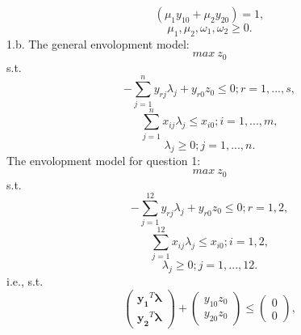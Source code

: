 \documentclass{article}
\begin{document}
$$ (\mu_1 y_{10} + \mu_2 y_{20}) = 1, $$
$$ \mu_1, \mu_2, \omega_1, \omega_2 \geq 0. $$
1.b.
The general envolopment model:
$$ max\ z_0 $$
s.t.
$$ - \sum_{j = 1}^n y_{rj} \lambda_j + y_{r0} z_0 \leq 0; r = 1, ..., s, $$
$$ \sum_{j=1}^n x_{ij} \lambda_j \leq x_{i0}; i = 1, ..., m, $$
$$ \lambda_j \geq 0; j = 1, ..., n. $$
The envolopment model for question 1:
$$ max\ z_0 $$
s.t.
$$ - \sum_{j = 1}^{12} y_{rj} \lambda_j + y_{r0} z_0 \leq 0; r = 1, 2, $$
$$ \sum_{j=1}^{12} x_{ij} \lambda_j \leq x_{i0}; i = 1, 2, $$
$$ \lambda_j \geq 0; j = 1, ..., 12. $$
i.e., s.t.
$$
\begin{pmatrix}
  \boldsymbol{y_1}^T \boldsymbol{\lambda} \\
  \boldsymbol{y_2}^T \boldsymbol{\lambda}
\end{pmatrix}
+
\begin{pmatrix}
  y_{10} z_0 \\
  y_{20} z_0
\end{pmatrix}
\leq
\begin{pmatrix}
  0 \\
  0
\end{pmatrix},
$$
\end{document}
